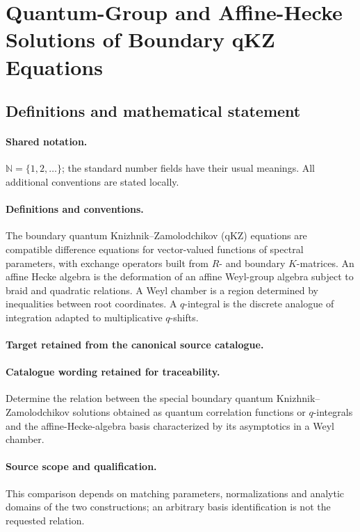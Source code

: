\documentclass[11pt]{article}
\begin{document}
\section{Quantum-Group and Affine-Hecke Solutions of Boundary qKZ Equations}\label{statement}

\subsection{Definitions and mathematical statement}

\paragraph{Shared notation.}$\mathbb N=\{1,2,\ldots\}$; the standard number fields have their usual meanings. All additional conventions are stated locally.


\paragraph{Definitions and conventions.}
The boundary quantum Knizhnik--Zamolodchikov (qKZ) equations are compatible difference equations for vector-valued functions of spectral parameters, with exchange operators built from $R$- and boundary $K$-matrices. An affine Hecke algebra is the deformation of an affine Weyl-group algebra subject to braid and quadratic relations. A Weyl chamber is a region determined by inequalities between root coordinates. A $q$-integral is the discrete analogue of integration adapted to multiplicative $q$-shifts.

\paragraph{Target retained from the canonical source catalogue.}
\paragraph{Catalogue wording retained for traceability.}
Determine the relation between the special boundary quantum Knizhnik–Zamolodchikov solutions obtained as quantum correlation functions or $q$-integrals and the affine-Hecke-algebra basis characterized by its asymptotics in a Weyl chamber.

\paragraph{Source scope and qualification.}
This comparison depends on matching parameters, normalizations and analytic domains of the two constructions; an arbitrary basis identification is not the requested relation.
\end{document}
